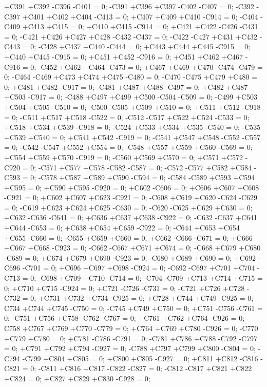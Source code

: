 +C391 +C392 -C396 -C401 = 0;
-C391 +C396 +C397 -C402 -C407 = 0;
-C392 -C397 +C401 +C402 +C404 -C413 = 0;
+C407 +C409 +C410 -C914 = 0;
-C404 -C409 +C413 +C415 = 0;
+C410 +C415 -C914 = 0;
+C421 +C422 -C426 -C431 = 0;
-C421 +C426 +C427 +C428 -C432 -C437 = 0;
-C422 -C427 +C431 +C432 -C443 = 0;
-C428 +C437 +C440 -C444 = 0;
+C443 +C444 +C445 -C915 = 0;
+C440 +C445 -C915 = 0;
+C451 +C452 -C916 = 0;
+C451 +C462 +C467 -C916 = 0;
-C452 +C462 +C464 -C473 = 0;
+C467 +C469 +C470 -C474 -C479 = 0;
-C464 -C469 +C473 +C474 +C475 -C480 = 0;
-C470 -C475 +C479 +C480 = 0;
+C481 +C482 -C917 = 0;
-C481 +C487 +C488 -C497 = 0;
+C482 +C487 +C503 -C917 = 0;
-C488 +C497 +C499 +C500 -C504 -C509 = 0;
-C499 +C503 +C504 +C505 -C510 = 0;
-C500 -C505 +C509 +C510 = 0;
+C511 +C512 -C918 = 0;
-C511 +C517 +C518 -C522 = 0;
-C512 -C517 +C522 +C524 -C533 = 0;
+C518 +C534 +C539 -C918 = 0;
-C524 +C533 +C534 +C535 -C540 = 0;
-C535 +C539 +C540 = 0;
+C541 +C542 -C919 = 0;
-C541 +C547 +C548 -C552 -C557 = 0;
-C542 -C547 +C552 +C554 = 0;
-C548 +C557 +C559 +C560 -C569 = 0;
+C554 +C559 +C570 -C919 = 0;
-C560 +C569 +C570 = 0;
+C571 +C572 -C920 = 0;
-C571 +C577 +C578 -C582 -C587 = 0;
-C572 -C577 +C582 +C584 -C593 = 0;
-C578 +C587 +C589 +C590 -C594 = 0;
-C584 -C589 +C593 +C594 +C595 = 0;
+C590 +C595 -C920 = 0;
+C602 -C606 = 0;
+C606 +C607 +C608 -C921 = 0;
+C602 +C607 +C623 -C921 = 0;
-C608 +C619 +C620 -C624 -C629 = 0;
-C619 +C623 +C624 +C625 -C630 = 0;
-C620 -C625 +C629 +C630 = 0;
+C632 -C636 -C641 = 0;
+C636 +C637 +C638 -C922 = 0;
-C632 -C637 +C641 +C644 -C653 = 0;
+C638 +C654 +C659 -C922 = 0;
-C644 +C653 +C654 +C655 -C660 = 0;
-C655 +C659 +C660 = 0;
+C662 -C666 -C671 = 0;
+C666 +C667 +C668 -C923 = 0;
-C662 -C667 +C671 +C674 = 0;
-C668 +C679 +C680 -C689 = 0;
+C674 +C679 +C690 -C923 = 0;
-C680 +C689 +C690 = 0;
+C692 -C696 -C701 = 0;
+C696 +C697 +C698 -C924 = 0;
-C692 -C697 +C701 +C704 -C713 = 0;
-C698 +C709 +C710 -C714 = 0;
-C704 -C709 +C713 +C714 +C715 = 0;
+C710 +C715 -C924 = 0;
+C721 -C726 -C731 = 0;
-C721 +C726 +C728 -C732 = 0;
+C731 +C732 +C734 -C925 = 0;
+C728 +C744 +C749 -C925 = 0;
-C734 +C744 +C745 -C750 = 0;
-C745 +C749 +C750 = 0;
+C751 -C756 -C761 = 0;
-C751 +C756 +C758 -C762 -C767 = 0;
+C761 +C762 +C764 -C926 = 0;
-C758 +C767 +C769 +C770 -C779 = 0;
+C764 +C769 +C780 -C926 = 0;
-C770 +C779 +C780 = 0;
+C781 -C786 -C791 = 0;
-C781 +C786 +C788 -C792 -C797 = 0;
+C791 +C792 +C794 -C927 = 0;
-C788 +C797 +C799 +C800 -C804 = 0;
-C794 -C799 +C804 +C805 = 0;
+C800 +C805 -C927 = 0;
+C811 +C812 -C816 -C821 = 0;
-C811 +C816 +C817 -C822 -C827 = 0;
-C812 -C817 +C821 +C822 +C824 = 0;
+C827 +C829 +C830 -C928 = 0;
